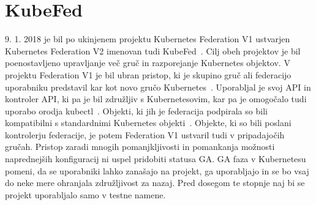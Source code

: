 \documentclass[a4paper, 12pt]{book}
\begin{document}
\section{KubeFed}
9. 1. 2018 je bil po ukinjenem projektu Kubernetes Federation V1 ustvarjen Kubernetes Federation V2 imenovan tudi KubeFed~\cite{kubernetes-federation-evolution}.
Cilj obeh projektov je bil poenostavljeno upravljanje več gruč in razporejanje Kubernetes objektov.
V projektu Federation V1 je bil ubran pristop, ki je skupino gruč ali federacijo uporabniku predstavil kar kot novo gručo Kubernetes~\cite{setup-cluster-federation-kubefed-v1}.
Uporabljal je svoj API in kontroler API, ki pa je bil združljiv s Kubernetesovim, kar pa je omogočalo tudi uporabo orodja kubectl~\cite{cluster-federation-in-Kubernetes-1.5}.
Objekti, ki jih je federacija podpirala so bili kompatibilni s standardnimi Kubernetes objekti~\cite{federated-cluster-kubefed-v1}.
Objekte, ki so bili poslani kontrolerju federacije, je potem Federation V1 ustvaril tudi v pripadajočih gručah.
Pristop zaradi mnogih pomanjkljivosti in pomankanja možnosti naprednejših konfiguracij ni uspel pridobiti statusa GA.
GA faza v Kubernetesu pomeni, da se uporabniki lahko zanašajo na projekt, ga uporabljajo in se bo vsaj do neke mere ohranjala združljivost za nazaj.
  Pred dosegom te stopnje naj bi se projekt uporabljalo samo v testne namene.
\end{document}
